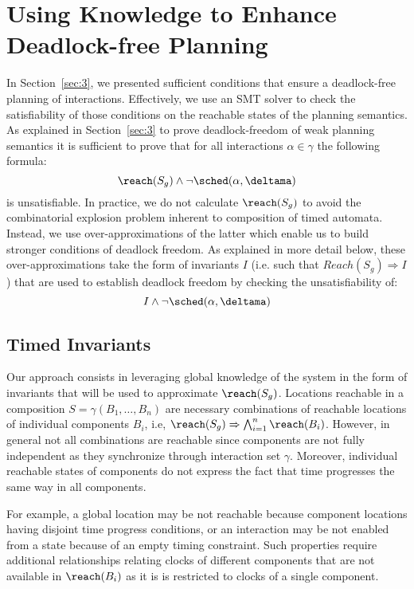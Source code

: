 \section{Using Knowledge to Enhance Deadlock-free Planning}\label{sec:4}
In Section~\ref{sec:3}, we presented sufficient conditions that ensure a deadlock-free planning of interactions.
Effectively, we use an SMT solver to check the satisfiability of those conditions on the reachable states of the planning 
semantics. 
As explained in Section~\ref{sec:3} to prove deadlock-freedom of weak planning semantics it is sufficient to prove that for all interactions $\alpha \in \gamma$ the following formula:
$$ \reach(S_g) \wedge \neg \sched(\alpha, \deltama) $$
is unsatisfiable.
In practice, we do not calculate $\reach(S_g)$ to avoid the combinatorial explosion problem inherent to composition of timed automata.
Instead, we use over-approximations of the latter which enable us to build stronger conditions of deadlock freedom.
As explained in more detail below, these over-approximations take the form of invariants $I$ (i.e. such that $Reach(S_g) \Rightarrow I$) that are used to establish deadlock freedom by checking the unsatisfiability of:
$$ I \wedge \neg \sched(\alpha, \deltama) $$


\subsection*{Timed Invariants}\label{sec:hinv}

Our approach consists in leveraging  global knowledge of the system in the form of invariants that will be used to approximate $\reach(S_g)$.  
Locations reachable in a composition $S = \gamma(B_1,\dotsc,B_n)$ are necessary combinations of reachable locations of individual components $B_i$, i.e, 
$\reach(S_g)\Rightarrow\bigwedge_{i=1}^n \reach(B_i)$.
However, in general not all combinations are reachable since components are not fully independent as they synchronize through interaction set $\gamma$.
Moreover, individual reachable states of components do not express the fact that time progresses the same way in all components.

For example, a global location may be not reachable because component locations having disjoint time progress conditions, or an interaction may be not enabled from a state because 
of an empty timing constraint.
Such properties require additional relationships relating clocks of different components that are not available in $\reach(B_i)$ as it is is restricted to clocks of a single component.

